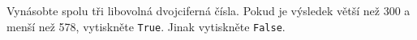 \question[30]
Vynásobte spolu tři libovolná dvojciferná čísla. Pokud je výsledek větší než 300
a menší než 578, vytiskněte \texttt{True}. Jinak vytiskněte \texttt{False}.